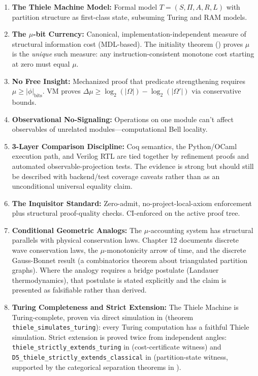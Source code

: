 \begin{enumerate}
    \item \textbf{The Thiele Machine Model:} Formal model $T = (S, \Pi, A, R, L)$ with partition structure as first-class state, subsuming Turing and RAM models.

    \item \textbf{The $\mu$-bit Currency:} Canonical, implementation-independent measure of structural information cost (MDL-based). The initiality theorem () proves $\mu$ is the \emph{unique} such measure: any instruction-consistent monotone cost starting at zero must equal $\mu$.

    \item \textbf{No Free Insight:} Mechanized proof that predicate strengthening requires $\mu \ge |\phi|_{\text{bits}}$. VM proves $\Delta\mu \ge \log_2(|\Omega|) - \log_2(|\Omega'|)$ via conservative bounds.

    \item \textbf{Observational No-Signaling:} Operations on one module can't affect observables of unrelated modules---computational Bell locality.

    \item \textbf{3-Layer Comparison Discipline:} Coq semantics, the Python/OCaml execution path, and Verilog RTL are tied together by refinement proofs and automated observable-projection tests. The evidence is strong but should still be described with backend/test coverage caveats rather than as an unconditional universal equality claim.

    \item \textbf{The Inquisitor Standard:} Zero-admit, no-project-local-axiom enforcement plus structural proof-quality checks. CI-enforced on the active proof tree.

    \item \textbf{Conditional Geometric Analogs:} The $\mu$-accounting system has structural parallels with physical conservation laws. Chapter 12 documents discrete wave conservation laws, the $\mu$-monotonicity arrow of time, and the discrete Gauss-Bonnet result (a combinatorics theorem about triangulated partition graphs). Where the analogy requires a bridge postulate (Landauer thermodynamics), that postulate is stated explicitly and the claim is presented as falsifiable rather than derived.

    \item \textbf{Turing Completeness and Strict Extension:} The Thiele Machine is Turing-complete, proven via direct simulation in  (theorem \texttt{thiele\_simulates\_turing}): every Turing computation has a faithful Thiele simulation. Strict extension is proved twice from independent angles: \texttt{thiele\_strictly\_extends\_turing} in  (cost-certificate witness) and \texttt{D5\_thiele\_strictly\_extends\_classical} in  (partition-state witness, supported by the categorical separation theorems in ).


\end{enumerate}
